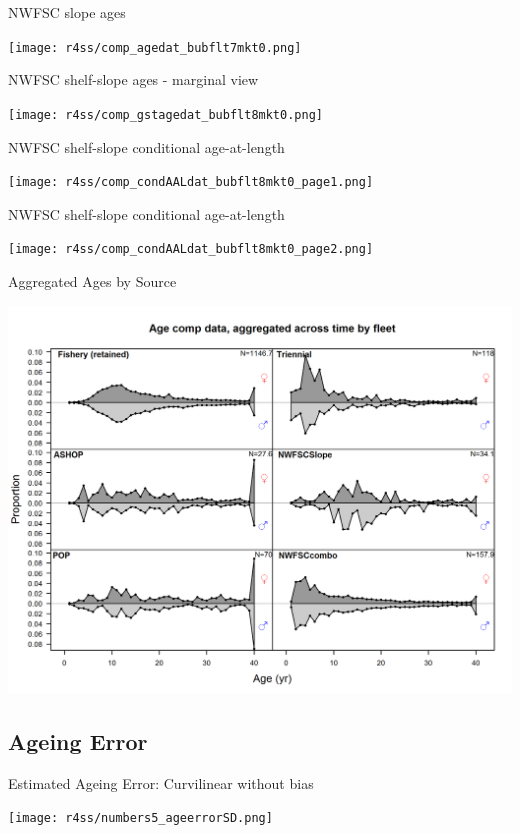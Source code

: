 \documentclass[pdf]{beamer}\usepackage[]{graphicx}\usepackage[]{color}
\begin{document}
\begin{frame}{NWFSC slope ages}
  \begin{center}
    \texttt{[image: r4ss/comp\_agedat\_bubflt7mkt0.png]}
  \end{center}
\end{frame}

\begin{frame}{NWFSC shelf-slope ages - marginal view}
  \begin{center}
    \texttt{[image: r4ss/comp\_gstagedat\_bubflt8mkt0.png]}
  \end{center}
\end{frame}

\begin{frame}{NWFSC shelf-slope conditional age-at-length}
  \begin{center}
    \texttt{[image: r4ss/comp\_condAALdat\_bubflt8mkt0\_page1.png]}
  \end{center}
\end{frame}

\begin{frame}{NWFSC shelf-slope conditional age-at-length}
  \begin{center}
    \texttt{[image: r4ss/comp\_condAALdat\_bubflt8mkt0\_page2.png]}
  \end{center}
\end{frame}


\begin{frame}{Aggregated Ages by Source}
  \begin{center}
    \includegraphics[scale = 0.50]{figures/comp_agedat__aggregated_across_time.png}
  \end{center}
\end{frame}


\subsection{Ageing Error}
\begin{frame}{Estimated Ageing Error: Curvilinear without bias}
  \begin{center}
    \texttt{[image: r4ss/numbers5\_ageerrorSD.png]}
  \end{center}
\end{frame}

  
  
  
\end{document}
